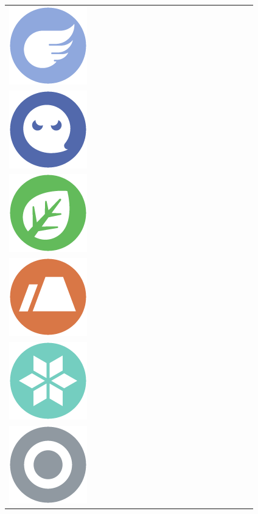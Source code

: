 \begin{table}[h]
\begin{tabular}{c c c c c c c c c c c c c c c c c c c c}
    \includegraphics[scale=.1]{images/flying.png} \\
    \includegraphics[scale=.1]{images/ghost.png} \\
    \includegraphics[scale=.1]{images/grass.png} \\
    \includegraphics[scale=.1]{images/ground.png} \\
    \includegraphics[scale=.1]{images/ice.png} \\
  \includegraphics[scale=.1]{images/normal.png} \\

\end{tabular}
\end{table}
